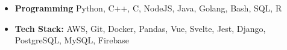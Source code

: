 
\begin{itemize}[leftmargin=9pt,label=]
  \item \textbf{Programming} Python, C++, C, NodeJS, Java, Golang, Bash, SQL, R
  \item \textbf{Tech Stack:}
    AWS,
    Git,
    Docker,
    Pandas,
    Vue,
    Svelte,
    Jest,
    Django,
    PostgreSQL,
    MySQL,
    Firebase
\end{itemize}

\vspace{0.1cm} \par

